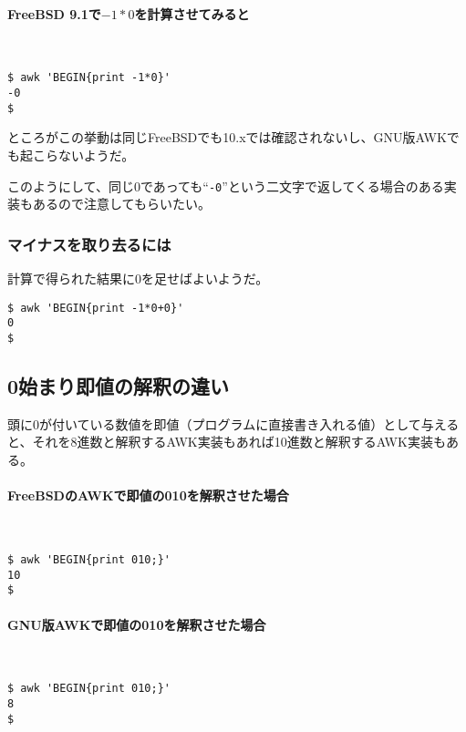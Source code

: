 \paragraph{FreeBSD 9.1で$-1*0$を計算させてみると}　\\
\begin{screen}
	\verb|$ awk 'BEGIN{print -1*0}'| \return \\
	\verb|-0| \\
	\verb|$ |
\end{screen}

ところがこの挙動は同じFreeBSDでも10.xでは確認されないし、GNU版AWKでも起こらないようだ。

このようにして、同じ0であっても``\verb|-0|''という二文字で返してくる場合のある実装もあるので注意してもらいたい。

\subsubsection*{マイナスを取り去るには}

計算で得られた結果に0を足せばよいようだ。
\begin{screen}
	\verb|$ awk 'BEGIN{print -1*0+0}'| \return \\
	\verb|0| \\
	\verb|$ |
\end{screen}

\subsection*{0始まり即値の解釈の違い}

頭に0が付いている数値を即値（プログラムに直接書き入れる値）として与えると、それを8進数と解釈するAWK実装もあれば10進数と解釈するAWK実装もある。

\paragraph{FreeBSDのAWKで即値の010を解釈させた場合}　\\
\begin{screen}
	\verb|$ awk 'BEGIN{print 010;}'| \return \\
	\verb|10| \\
	\verb|$ |
\end{screen}

\paragraph{GNU版AWKで即値の010を解釈させた場合}　\\
\begin{screen}
	\verb|$ awk 'BEGIN{print 010;}'| \return \\
	\verb|8| \\
	\verb|$ |
\end{screen}

